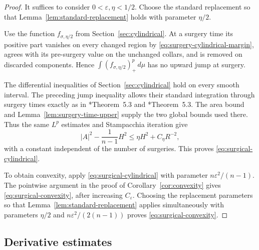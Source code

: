 \documentclass[11pt,reqno]{amsart}
\theoremstyle{definition}
\theoremstyle{remark}
\numberwithin{equation}{section}
\begin{document}
\begin{proof}
  It suffices to consider $0<\varepsilon,\eta<1/2$.  Choose the standard
  replacement so that Lemma~\ref{lem:standard-replacement} holds with
  parameter $\eta/2$.

  Use the function $f_{\sigma,\eta/2}$ from
  Section~\ref{sec:cylindrical}.  At a surgery time its positive part vanishes
  on every changed region by \eqref{eq:surgery-cylindrical-margin}, agrees
  with its pre-surgery value on the unchanged collars, and is removed on
  discarded components.  Hence $\int (f_{\sigma,\eta/2})_+^p\,d\mu$  
  has no upward jump at surgery.

  The differential inequalities of Section~\ref{sec:cylindrical} hold on
  every smooth interval.  The preceding jump inequality allows their
  standard integration through surgery times exactly as in
  \cite{HS09}*{Theorem~5.3} and \cite{LN21}*{Theorem~5.3}.  The area bound and
  Lemma~\ref{lem:surgery-time-upper} supply the two global bounds used there.
  Thus the same $L^p$ estimates and Stampacchia iteration give
  \begin{equation*}
  |A|^2-\frac1{n-1}H^2
  \leq
  \eta H^2+C_\eta R^{-2},
  \end{equation*}
  with a constant independent of the number of surgeries.  This proves
  \eqref{eq:surgical-cylindrical}.

  To obtain convexity, apply \eqref{eq:surgical-cylindrical} with parameter
  $n\varepsilon^2/(n-1)$.  The pointwise argument in the proof of
  Corollary~\ref{cor:convexity} gives \eqref{eq:surgical-convexity}, after
  increasing $C_\varepsilon$.
  Choosing the replacement parameters so that
  Lemma~\ref{lem:standard-replacement} applies simultaneously with
  parameters $\eta/2$ and $n\varepsilon^2/(2(n-1))$ proves
  \eqref{eq:surgical-convexity}.
\end{proof}


\subsection{Derivative estimates}
\end{document}
